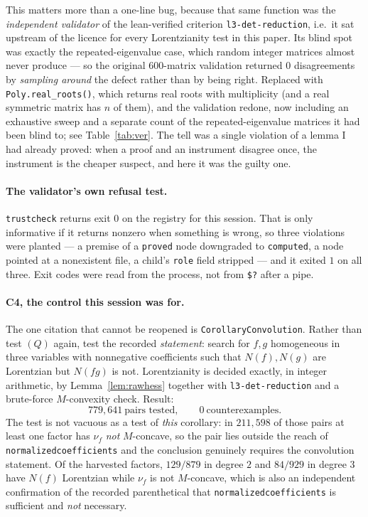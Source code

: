 \documentclass[11pt]{article}
\theoremstyle{plain}
\theoremstyle{definition}
\begin{document}
This matters more than a one-line bug, because that same function was the
\emph{independent validator} of the lean-verified criterion \texttt{l3-det-reduction},
i.e.\ it sat upstream of the licence for every Lorentzianity test in this paper. Its blind
spot was exactly the repeated-eigenvalue case, which random integer matrices almost never
produce --- so the original $600$-matrix validation returned $0$ disagreements by
\emph{sampling around} the defect rather than by being right. Replaced with
\texttt{Poly.real\_roots()}, which returns real roots with multiplicity (and a real
symmetric matrix has $n$ of them), and the validation redone, now including an exhaustive
sweep and a separate count of the repeated-eigenvalue matrices it had been blind to; see
Table~\ref{tab:ver}. The tell was a single violation of a lemma I had already proved: when
a proof and an instrument disagree once, the instrument is the cheaper suspect, and here it
was the guilty one.

\paragraph{The validator's own refusal test.}
\texttt{trustcheck} returns exit $0$ on the registry for this session. That is only
informative if it returns nonzero when something is wrong, so three violations were planted
--- a premise of a \texttt{proved} node downgraded to \texttt{computed}, a node pointed at a
nonexistent file, a child's \texttt{role} field stripped --- and it exited $1$ on all three.
Exit codes were read from the process, not from \verb|$?| after a pipe.

\paragraph{C4, the control this session was for.}
The one citation that cannot be reopened is \verb|CorollaryConvolution|. Rather than test
$(Q)$ again, test the recorded \emph{statement}: search for $f,g$ homogeneous in three
variables with nonnegative coefficients such that $N(f),N(g)$ are Lorentzian but $N(fg)$
is not. Lorentzianity is decided exactly, in integer arithmetic, by
Lemma~\ref{lem:rawhess} together with \texttt{l3-det-reduction} and a brute-force
$M$-convexity check. Result:
\[
  779{,}641\ \text{pairs tested},\qquad 0\ \text{counterexamples}.
\]
The test is not vacuous as a test of \emph{this} corollary: in $211{,}598$ of those pairs
at least one factor has $\nu_f$ \emph{not} $M$-concave, so the pair lies outside the reach
of \verb|normalizedcoefficients| and the conclusion genuinely requires the convolution
statement. Of the harvested factors, $129/879$ in degree $2$ and $84/929$ in degree $3$
have $N(f)$ Lorentzian while $\nu_f$ is not $M$-concave, which is also an independent
confirmation of the recorded parenthetical that \verb|normalizedcoefficients| is
sufficient and \emph{not} necessary.
\end{document}
